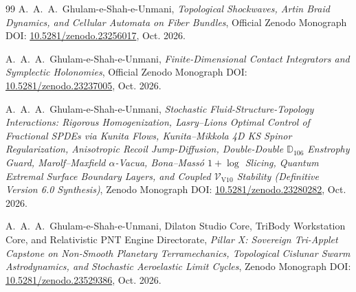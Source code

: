 \documentclass[11pt,a4paper,reqno]{article}
\theoremstyle{plain}
\theoremstyle{definition}
\theoremstyle{remark}
\numberwithin{equation}{section}
\begin{document}
\begin{thebibliography}{99}
A.~A.~A.~Ghulam-e-Shah-e-Unmani,
\textit{Topological Shockwaves, Artin Braid Dynamics, and Cellular Automata on Fiber Bundles},
Official Zenodo Monograph DOI: \href{https://doi.org/10.5281/zenodo.23256017}{10.5281/zenodo.23256017}, Oct. 2026.

A.~A.~A.~Ghulam-e-Shah-e-Unmani,
\textit{Finite-Dimensional Contact Integrators and Symplectic Holonomies},
Official Zenodo Monograph DOI: \href{https://doi.org/10.5281/zenodo.23237005}{10.5281/zenodo.23237005}, Oct. 2026.

A.~A.~A.~Ghulam-e-Shah-e-Unmani,
\textit{Stochastic Fluid-Structure-Topology Interactions: Rigorous Homogenization, Lasry--Lions Optimal Control of Fractional SPDEs via Kunita Flows, Kunita--Mikkola 4D KS Spinor Regularization, Anisotropic Recoil Jump-Diffusion, Double-Double $\mathbb{D}_{106}$ Enstrophy Guard, Marolf--Maxfield $\alpha$-Vacua, Bona--Mass\'o $1+\log$ Slicing, Quantum Extremal Surface Boundary Layers, and Coupled $\mathcal{V}_{\mathrm{V10}}$ Stability (Definitive Version 6.0 Synthesis)},
Zenodo Monograph DOI: \href{https://doi.org/10.5281/zenodo.23280282}{10.5281/zenodo.23280282}, Oct. 2026.

A.~A.~A.~Ghulam-e-Shah-e-Unmani, {Dilaton Studio Core}, {TriBody Workstation Core}, and {Relativistic PNT Engine Directorate},
\textit{Pillar X: Sovereign Tri-Applet Capstone on Non-Smooth Planetary Terramechanics, Topological Cislunar Swarm Astrodynamics, and Stochastic Aeroelastic Limit Cycles},
Zenodo Monograph DOI: \href{https://doi.org/10.5281/zenodo.23529386}{10.5281/zenodo.23529386}, Oct. 2026.

\end{thebibliography}
\end{document}
